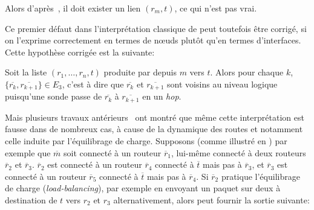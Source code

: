 Alors d'après~, il doit exister un lien $(r_m, t)$,
ce qui n'est pas vrai.


Ce premier défaut dans l'interprétation classique de \traceroute peut toutefois
être corrigé, si on l'exprime correctement en termes de n\oe{}uds \LLL plutôt qu'en
termes d'interfaces. Cette hypothèse corrigée est la suivante:

\begin{hypothese} Soit la
liste $(r_1, \ldots, r_n, t)$ produite par \traceroute depuis $m$ vers $t$.
Alors pour chaque $k$, $\{\overline{r_k},\overline{r_{k+1}}\} \in E_3$, c'est à
dire que $\overline{r_k}$ et $\overline{r_{k+1}}$ sont voisins au niveau logique
puisqu'une sonde passe de $\overline{r_k}$ à $\overline{r_{k+1}}$ en un {\em
hop}.
\label{hyp:traceroute-classique-corr}
\end{hypothese}

Mais plusieurs travaux
antérieurs~\cite{paristraceroute,willinger,SherwoodBS08,SpringMWA04,paristraceroute,AugustinCOVFLMT06}
ont montré que même cette interprétation est fausse dans de nombreux cas, à
cause de la dynamique des routes et notamment celle induite par l'équilibrage de
charge.
Supposons (comme illustré en ) par exemple que
${\overline m}$ soit connecté à un routeur ${\overline r_1}$, lui-même connecté
à deux routeurs ${\overline r_2}$ et ${\overline r_3}$.
${\overline r_2}$ est connecté à un routeur ${\overline r_4}$ connecté à
$\overline{t}$ mais pas à ${\overline r_3}$, et ${\overline r_3}$ est connecté à
un routeur ${\overline r_5}$ connecté à ${\overline t}$ mais pas à ${\overline r_4}$. Si
${\overline r_2}$ pratique l'équilibrage de charge ({\em load-balancing}), par
exemple en envoyant un paquet sur deux à destination de $t$ vers $r_2$ et $r_3$
alternativement, alors \traceroute peut fournir la sortie suivante:

